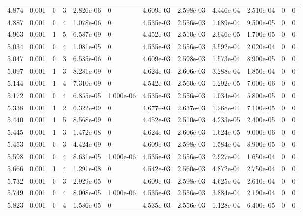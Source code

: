 \documentclass[preview]{standalone}
\begin{document}
{{{\begin{tabular}{L{1.2cm}C{1.2cm} C{0.3cm}C{0.5cm} C{1.4cm}C{1.4cm} C{1.4cm}C{1.4cm} C{1.6cm}C{1.6cm} C{1.6cm}C{1.6cm}}
  4.874  &  0.001  & 0     &  3 &  2.826e-06  & 0  &  4.609e-03&   2.598e-03& 4.446e-04 & 2.510e-04   &  0 & 0  \\ 
  4.887  &  0.001  & 0     &  4 &  1.078e-06  & 0  &  4.535e-03&   2.556e-03& 1.689e-04 & 9.500e-05   &  0 & 0  \\ 
  4.963  &  0.001  & 1     &  5 &  6.587e-09  & 0  &  4.452e-03&   2.510e-03& 2.946e-05 & 1.700e-05   &  0 & 0  \\ 
  5.034  &  0.001  & 0     &  4 &  1.081e-05  & 0  &  4.535e-03&   2.556e-03& 3.592e-04 & 2.020e-04   &  0 & 0  \\ 
  5.047  &  0.001  & 0     &  3 &  6.535e-06  & 0  &  4.609e-03&   2.598e-03& 1.573e-04 & 8.900e-05   &  0 & 0  \\ 
  5.097  &  0.001  & 1     &  3 &  8.281e-09  & 0  &  4.624e-03&   2.606e-03& 3.288e-04 & 1.850e-04   &  0 & 0  \\ 
  5.144  &  0.001  & 1     &  4 &  7.310e-09  & 0  &  4.542e-03&   2.560e-03& 1.292e-05 & 7.000e-06   &  0 & 0  \\ 
  5.172  &  0.001  & 0     &  4 &  6.855e-05  & 1.000e-06  &  4.535e-03&   2.556e-03& 1.034e-04 & 5.800e-05   &  0 & 0  \\ 
  5.338  &  0.001  & 1     &  2 &  6.322e-09  & 0  &  4.677e-03&   2.637e-03& 1.268e-04 & 7.100e-05   &  0 & 0  \\ 
  5.440  &  0.001  & 1     &  5 &  8.568e-09  & 0  &  4.452e-03&   2.510e-03& 4.233e-05 & 2.400e-05   &  0 & 0  \\ 
  5.445  &  0.001  & 1     &  3 &  1.472e-08  & 0  &  4.624e-03&   2.606e-03& 1.624e-05 & 9.000e-06   &  0 & 0  \\ 
  5.453  &  0.001  & 0     &  3 &  4.424e-09  & 0  &  4.609e-03&   2.598e-03& 1.584e-04 & 8.900e-05   &  0 & 0  \\ 
  5.598  &  0.001  & 0     &  4 &  8.631e-05  & 1.000e-06  &  4.535e-03&   2.556e-03& 2.927e-04 & 1.650e-04   &  0 & 0  \\ 
  5.666  &  0.001  & 1     &  4 &  1.291e-08  & 0  &  4.542e-03&   2.560e-03& 4.872e-04 & 2.750e-04   &  0 & 0  \\ 
  5.732  &  0.001  & 0     &  3 &  2.929e-05  & 0  &  4.609e-03&   2.598e-03& 4.625e-04 & 2.610e-04   &  0 & 0  \\ 
  5.749  &  0.001  & 0     &  4 &  8.008e-05  & 1.000e-06  &  4.535e-03&   2.556e-03& 3.884e-04 & 2.190e-04   &  0 & 0  \\ 
  5.823  &  0.001  & 0     &  4 &  1.586e-05  & 0  &  4.535e-03&   2.556e-03& 1.128e-04 & 6.400e-05   &  0 & 0  \\ 

\end{tabular}}}}
\end{document}
